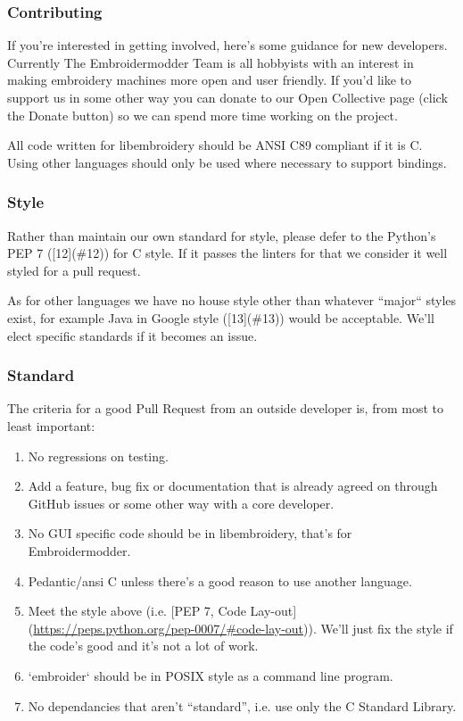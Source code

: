 \documentclass[a4paper, 11pt]{report}
\begin{document}
\subsubsection{Contributing}

If you're interested in getting involved, here's some guidance
for new developers. Currently The Embroidermodder Team is all
hobbyists with an interest in making embroidery machines more
open and user friendly. If you'd like to support us in some other way
you can donate to our Open Collective page (click the Donate button) so
we can spend more time working on the project.

All code written for libembroidery should be ANSI C89 compliant
if it is C. Using other languages should only be used where
necessary to support bindings.

\subsubsection{ Style}

Rather than maintain our own standard for style, please defer to
the Python's PEP 7 ([12](\#12)) for C style.
If it passes the linters for that we consider it well styled
for a pull request.

As for other languages we have no house style other than whatever
``major`` styles exist, for example Java in
Google style ([13](\#13))
would be acceptable. We'll elect specific standards if it becomes
an issue.

\subsubsection{Standard}

The criteria for a good Pull Request from an outside developer is,
from most to least important:

\begin{enumerate}
\item No regressions on testing.
\item Add a feature, bug fix or documentation that is already agreed on
   through GitHub issues or some other way with a core developer.
\item No GUI specific code should be in libembroidery, that's for Embroidermodder.
\item Pedantic/ansi C unless there's a good reason to use another language.
\item Meet the style above (i.e. [PEP 7, Code Lay-out](\url{https://peps.python.org/pep-0007/#code-lay-out})).
   We'll just fix the style if the code's good and it's not a lot of work.
\item `embroider` should be in POSIX style as a command line program.
\item No dependancies that aren't ``standard'', i.e. use only the C Standard Library.
\end{enumerate}
\end{document}
